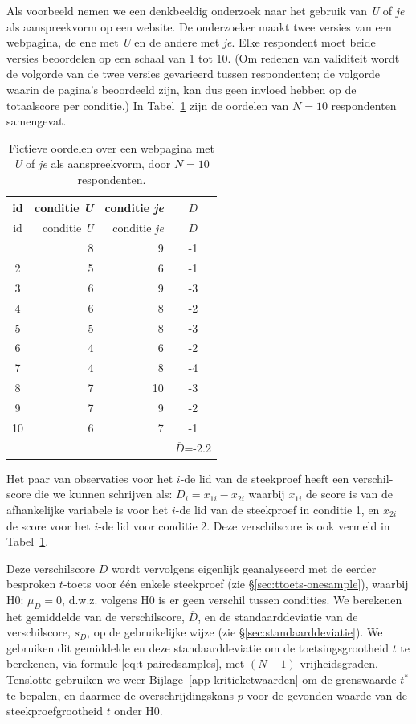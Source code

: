 \documentclass[
]{book}
\begin{document}
Als voorbeeld nemen we een denkbeeldig onderzoek naar het gebruik van
\emph{U} of \emph{je} als aanspreekvorm op een website. De onderzoeker maakt twee
versies van een webpagina, de ene met \emph{U} en de andere met \emph{je}. Elke
respondent moet beide versies beoordelen op een schaal van 1 tot 10. (Om
redenen van validiteit wordt de volgorde van de twee versies gevarieerd
tussen respondenten; de volgorde waarin de pagina's beoordeeld zijn, kan
dus geen invloed hebben op de totaalscore per conditie.) In
Tabel~\ref{tab:data-uje-paired} zijn de oordelen van \(N=10\)
respondenten samengevat.

\begin{longtable}[]{@{}crrc@{}}
\caption{\label{tab:data-uje-paired} Fictieve oordelen over een webpagina met \emph{U} of
\emph{je} als aanspreekvorm, door \(N=10\) respondenten.}\tabularnewline
\toprule\noalign{}
id & conditie \emph{U} & conditie \emph{je} & \(D\) \\
\midrule\noalign{}
\endfirsthead
\toprule\noalign{}
id & conditie \emph{U} & conditie \emph{je} & \(D\) \\
\midrule\noalign{}
\endhead
\bottomrule\noalign{}
\endlastfoot
1 & 8 & 9 & -1 \\
2 & 5 & 6 & -1 \\
3 & 6 & 9 & -3 \\
4 & 6 & 8 & -2 \\
5 & 5 & 8 & -3 \\
6 & 4 & 6 & -2 \\
7 & 4 & 8 & -4 \\
8 & 7 & 10 & -3 \\
9 & 7 & 9 & -2 \\
10 & 6 & 7 & -1 \\
& & & \(\overline{D}\)=-2.2 \\
\end{longtable}

Het paar van observaties voor het \(i\)-de lid van de steekproef heeft een
verschil-score die we kunnen schrijven als: \(D_i = x_{1i} - x_{2i}\)
waarbij \(x_{1i}\) de score is van de afhankelijke variabele is voor het
\(i\)-de lid van de steekproef in conditie 1, en \(x_{2i}\) de score voor
het \(i\)-de lid voor conditie 2. Deze verschilscore is ook vermeld in
Tabel~\ref{tab:data-uje-paired}.

Deze verschilscore \(D\) wordt vervolgens eigenlijk geanalyseerd met de
eerder besproken \(t\)-toets voor één enkele steekproef (zie
§\ref{sec:ttoets-onesample}), waarbij H0: \(\mu_D=0\), d.w.z. volgens H0
is er geen verschil tussen condities. We berekenen het gemiddelde van de
verschilscore, \(\overline{D}\), en de standaarddeviatie van de
verschilscore, \(s_{D}\), op de gebruikelijke wijze (zie
§\ref{sec:standaarddeviatie}). We gebruiken dit gemiddelde en deze
standaarddeviatie om de toetsingsgrootheid \(t\) te berekenen, via formule
\eqref{eq:t-pairedsamples}, met \((N-1)\) vrijheidsgraden. Tenslotte
gebruiken we weer Bijlage~\ref{app-kritieketwaarden} om de grenswaarde
\(t^*\) te bepalen, en daarmee de overschrijdingskans \(p\) voor de gevonden
waarde van de steekproefgrootheid \(t\) onder H0.
\end{document}
